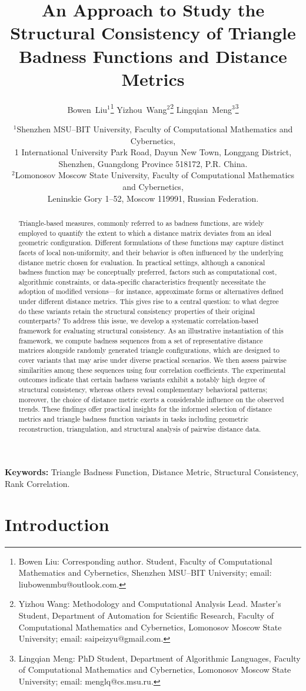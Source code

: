 \documentclass[11pt]{article}
\title{\textbf{An Approach to Study the Structural Consistency of Triangle Badness Functions and Distance Metrics}}
\author{%
Bowen~Liu$^{1}$\thanks{Bowen Liu: Corresponding author. Student, Faculty of Computational Mathematics and Cybernetics, Shenzhen MSU--BIT University; email: liubowenmbu@outlook.com.} \quad
Yizhou~Wang$^{2}$\thanks{Yizhou Wang: Methodology and Computational Analysis Lead. Master's Student, Department of Automation for Scientific Research, Faculty of Computational Mathematics and Cybernetics, Lomonosov Moscow State University; email: saipeizyu@gmail.com.} \quad
Lingqian~Meng$^{3}$\thanks{Lingqian Meng: PhD Student, Department of Algorithmic Languages, Faculty of Computational Mathematics and Cybernetics, Lomonosov Moscow State University; email: menglq@cs.msu.ru.}}
\date{\small
$^{1}$Shenzhen MSU--BIT University, Faculty of Computational Mathematics and Cybernetics,\\
1 International University Park Road, Dayun New Town, Longgang District, Shenzhen, Guangdong Province 518172, P.R. China.\\[0.25em]
$^{2}$Lomonosov Moscow State University, Faculty of Computational Mathematics and Cybernetics,\\
Leninskie Gory 1--52, Moscow 119991, Russian Federation.}
\begin{document}
\maketitle

\begin{abstract}
Triangle-based measures, commonly referred to as badness functions, are widely employed to quantify the extent to which a distance matrix deviates from an ideal geometric configuration. Different formulations of these functions may capture distinct facets of local non-uniformity, and their behavior is often influenced by the underlying distance metric chosen for evaluation. In practical settings, although a canonical badness function may be conceptually preferred, factors such as computational cost, algorithmic constraints, or data-specific characteristics frequently necessitate the adoption of modified versions—for instance, approximate forms or alternatives defined under different distance metrics. This gives rise to a central question: to what degree do these variants retain the structural consistency properties of their original counterparts? To address this issue, we develop a systematic correlation-based framework for evaluating structural consistency. As an illustrative instantiation of this framework, we compute badness sequences from a set of representative distance matrices alongside randomly generated triangle configurations, which are designed to cover variants that may arise under diverse practical scenarios. We then assess pairwise similarities among these sequences using four correlation coefficients. The experimental outcomes indicate that certain badness variants exhibit a notably high degree of structural consistency, whereas others reveal complementary behavioral patterns; moreover, the choice of distance metric exerts a considerable influence on the observed trends. These findings offer practical insights for the informed selection of distance metrics and triangle badness function variants in tasks including geometric reconstruction, triangulation, and structural analysis of pairwise distance data.
\end{abstract}


\noindent\textbf{Keywords:} Triangle Badness Function, Distance Metric, Structural Consistency, Rank Correlation.

\section{Introduction}
\end{document}
